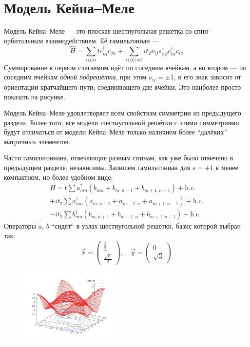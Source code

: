 \section{Модель Кейна--Меле}
	Модель Кейна--Меле --- это плоская шестиугольная решётка со спин--орбитальным
	взаимодействием. 
	Её гамильтониан --- 
	\begin{equation}
		\hat{H} = 
			\sum_{\langle ij \rangle \alpha} t c^\dagger_{i\alpha} c_{j\alpha} + 
				\sum_{\langle\langle ij \rangle\rangle \alpha\beta} 
					it_2 \nu_{ij} s^z_{\alpha \beta} c^\dagger_{i\alpha} c_{i\beta}
	\end{equation}
	Суммирование в первом слагаемом идёт по соседним ячейкам, а во втором --- по соседним
	ячейкам \emph{одной подрешётки}, при этом $\nu_{ij} = \pm 1$, и его знак зависит
	от ориентации кратчайшего пути, соединяющего две ячейки. Это наиболее просто показать
	на рисунке.

	Модель Кейна--Меле удовлетворяет всем 
	свойствам симметрии из предыдущего раздела. Более
	того, все модели шестиугольной решётки с этими симметриями будут отличаться от модели
	Кейна--Меле только наличием более ``далёких'' матричных элементов.

	Части гамильтониана, отвечающие разным спинам, как уже было отмечено в предыдущем
	разделе, независимы.
	Запишем гамильтониан для $s = +1$ в менее компактном, но более удобном виде:
	\begin{multline}
		H = t\sum a_{mn}^\dagger(b_{mn} + b_{m,n-1} + b_{m+1,n-1}) + \mbox{h.c.} \\
		+it_2 \sum a_{mn}^\dagger(a_{m,n+1} + a_{m-1,n} + a_{m+1,n-1}) + \mbox{h.c.} \\
		-it_2 \sum b_{mn}^\dagger(b_{m,n+1} + b_{m-1,n} + b_{m+1,n-1}) + \mbox{h.c.} 
	\end{multline}
	Операторы $a$, $b$ ``сидят`` в узлах шестиугольной решётки, базис которой выбран так:
	\begin{equation}
		\vec{x} = \left(\begin{matrix} \frac32 \\ \frac{\sqrt{3}}{2} \end{matrix}\right), \quad
		\vec{y} = \left(\begin{matrix} 0 \\ \sqrt{3} \end{matrix}\right)
	\end{equation}

	\begin{figure}
		\begin{center}
		\includegraphics[width=0.46\textwidth]{haldane_spectrum.jpg}
		\end{center}
	\end{figure}

